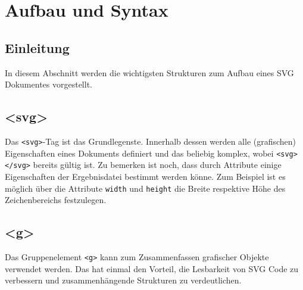 \section{Aufbau und Syntax}
\subsection{Einleitung}
In diesem Abschnitt werden die wichtigsten Strukturen zum Aufbau eines SVG Dokumentes vorgestellt.
 \subsection{<svg>}
 Das \texttt{<svg>}-Tag ist das Grundlegenste. Innerhalb dessen werden alle (grafischen) Eigenschaften eines Dokuments definiert und das beliebig komplex, wobei \texttt{<svg> </svg>} bereits gültig ist. Zu bemerken ist noch, dass durch Attribute einige Eigenschaften der Ergebnisdatei bestimmt werden könne. Zum Beispiel ist es möglich über die Attribute \texttt{width} und \texttt{height} die Breite respektive Höhe des Zeichenbereichs festzulegen.
 
 \subsection{<g>}
 Das Gruppenelement \texttt{<g>} kann zum Zusammenfassen grafischer Objekte verwendet werden. Das hat einmal den Vorteil, die Lesbarkeit von SVG Code zu verbessern und zusammenhängende Strukturen zu verdeutlichen.